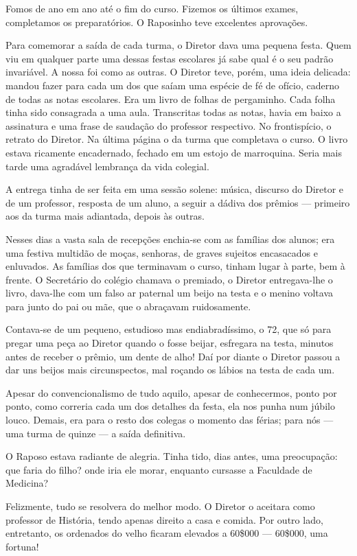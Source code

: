 Fomos de ano em ano até o fim do curso. Fizemos os últimos exames,
completamos os preparatórios. O Raposinho teve excelentes aprovações.

Para comemorar a saída de cada turma, o Diretor dava uma pequena festa.
Quem viu em qualquer parte uma dessas festas escolares já sabe qual é o
seu padrão invariável. A nossa foi como as outras. O Diretor teve,
porém, uma ideia delicada: mandou fazer para cada um dos que saíam uma
espécie de fé de ofício, caderno de todas as notas escolares. Era um
livro de folhas de pergaminho. Cada folha tinha sido consagrada a uma
aula. Transcritas todas as notas, havia em baixo a assinatura e uma
frase de saudação do professor respectivo. No frontispício, o retrato do
Diretor. Na última página o da turma que completava o curso. O livro
estava ricamente encadernado, fechado em um estojo de marroquina. Seria
mais tarde uma agradável lembrança da vida colegial.

A entrega tinha de ser feita em uma sessão solene: música, discurso do
Diretor e de um professor, resposta de um aluno, a seguir a dádiva dos
prêmios --- primeiro aos da turma mais adiantada, depois às outras.

Nesses dias a vasta sala de recepções enchia-se com as famílias dos
alunos; era uma festiva multidão de moças, senhoras, de graves sujeitos
encasacados e enluvados. As famílias dos que terminavam o curso, tinham
lugar à parte, bem à frente. O Secretário do colégio chamava o premiado,
o Diretor entregava-lhe o livro, dava-lhe com um falso ar paternal um
beijo na testa e o menino voltava para junto do pai ou mãe, que o
abraçavam ruidosamente.

Contava-se de um pequeno, estudioso mas endiabradíssimo, o 72, que só
para pregar uma peça ao Diretor quando o fosse beijar, esfregara na
testa, minutos antes de receber o prêmio, um dente de alho! Daí por
diante o Diretor passou a dar uns beijos mais circunspectos, mal roçando
os lábios na testa de cada um.

Apesar do convencionalismo de tudo aquilo, apesar de conhecermos, ponto
por ponto, como correria cada um dos detalhes da festa, ela nos punha
num júbilo louco. Demais, era para o resto dos colegas o momento das
férias; para nós --- uma turma de quinze --- a saída definitiva.

O Raposo estava radiante de alegria. Tinha tido, dias antes, uma
preocupação: que faria do filho? onde iria ele morar, enquanto cursasse
a Faculdade de Medicina?

Felizmente, tudo se resolvera do melhor modo. O Diretor o aceitara como
professor de História, tendo apenas direito a casa e comida. Por outro
lado, entretanto, os ordenados do velho ficaram elevados a 60\$000 ---
60\$000, uma fortuna!


